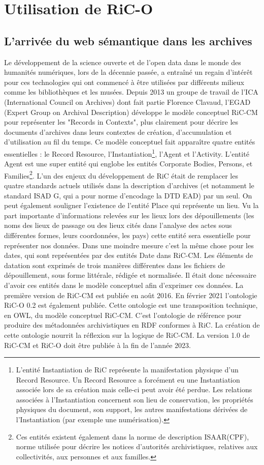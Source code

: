 \section{Utilisation de RiC-O}
\subsection{L'arrivée du web sémantique dans les archives}
 Le développement de la science ouverte et de l'open data dans le monde des humanités numériques, lors de la décennie passée, a entraîné un regain d'intérêt pour ces technologies qui ont commencé à être utilisées par différents milieux comme les bibliothèques et les musées. Depuis 2013 un groupe de travail de l'ICA (International Council on Archives) dont fait partie Florence Clavaud, l'EGAD (Expert Group on Archival Description) développe le modèle conceptuel RiC-CM pour représenter les "Records in Contexts", plus clairement pour décrire les documents d'archives dans leurs contextes de création, d'accumulation et d'utilisation au fil du temps. Ce modèle conceptuel fait apparaître quatre entités essentielles : le Record Resource, l'Instantiation\footnote{L'entité Instantiation de RiC représente la manifestation physique d'un Record Resource. Un Record Resource a forcément eu une Instantiation associée lors de sa création mais celle-ci peut avoir été perdue. Les relations associées à l'Instantiation concernent son lieu de conservation, les propriétés physiques du document, son support, les autres manifestations dérivées de l'Instantiation (par exemple une numérisation).}, l'Agent et l'Activity. L'entité Agent est une super entité qui englobe les entités Corporate Bodies, Persons, et Families\footnote{Ces entités existent également dans la norme de description ISAAR(CPF), norme utilisée pour décrire les notices d'autorités archivistiques, relatives aux collectivités, aux personnes et aux familles.}. L'un des enjeux du développement de RiC était de remplacer les quatre standards actuels utilisés dans la description d'archives (et notamment le standard ISAD G, qui a pour norme d'encodage la DTD EAD) par un seul. On peut également souligner l'existence de l'entité Place qui représente un lieu. Vu la part importante d'informations relevées sur les lieux lors des dépouillements (les noms des lieux de passage ou des lieux cités dans l'analyse des actes sous différentes formes, leurs coordonnées, les pays) cette entité sera essentielle pour représenter nos données. Dans une moindre mesure c'est la même chose pour les dates, qui sont représentées par des entités Date dans RiC-CM. Les éléments de datation sont exprimés de trois manières différentes dans les fichiers de dépouillement, sous forme littérale, rédigée et normalisée. Il était donc nécessaire d'avoir ces entités dans le modèle conceptuel afin d'exprimer ces données. La première version de RiC-CM est publiée en août 2016. En février 2021 l'ontologie RiC-O 0.2 est également publiée. Cette ontologie est une transposition technique, en OWL, du modèle conceptuel RiC-CM. C'est l'ontologie de référence pour produire des métadonnées archivistiques en RDF conformes à RiC. La création de cette ontologie nourrit la réflexion sur la logique de RiC-CM. La version 1.0 de RiC-CM et RiC-O doit être publiée à la fin de l'année 2023.


